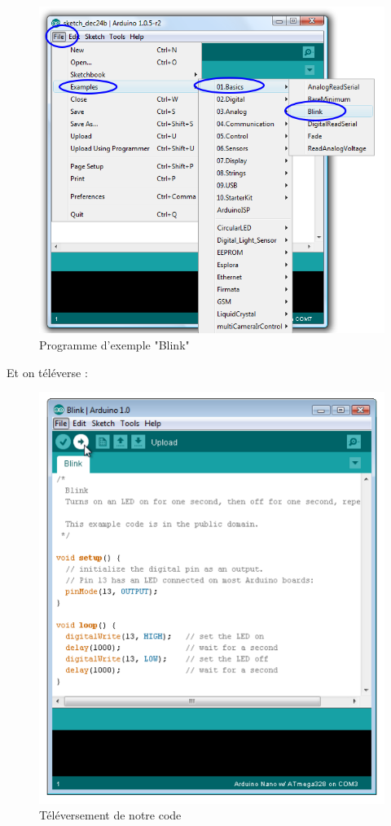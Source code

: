 \documentclass[12pt,a4paper]{article}
\begin{document}
\begin{figure}[h!]
    \centering
    \includegraphics[scale=0.7]{blink.png}
    \caption{Programme d'exemple "Blink"}
    \label{fig:my_label}
\end{figure}

\newpage
Et on téléverse : 
\begin{figure}[h!]
    \centering
    \includegraphics[scale=0.9]{televersement.PNG}
    \caption{Téléversement de notre code}
    \label{fig:my_label}
\end{figure}
\end{document}
